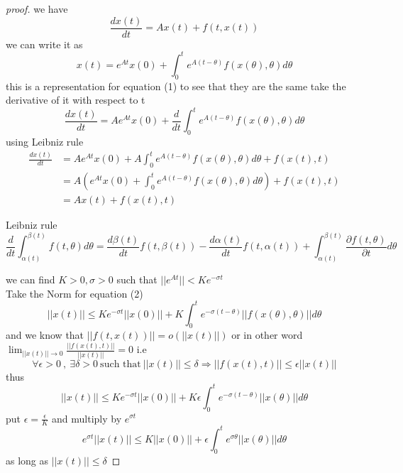 \documentclass[]{article}
\begin{document}
\begin{proof}[proof]
we have 
\begin{equation}
    \frac{dx(t)}{dt} = Ax(t) + f(t,x(t))
\end{equation}
we can write it as 
\begin{equation}
    x(t) = e^{At}x(0) + \int_{0}^{t} e^{A(t-\theta)} f(x(\theta),\theta) d \theta
\end{equation}
this is a representation for equation (1) to see that they are the same take the derivative of it with respect to t
\[
\frac{dx(t)}{dt} = A e^{At}x(0) + \frac{d}{dt} \int_{0}^{t} e^{A(t-\theta)} f(x(\theta),\theta) d \theta
\]
using Leibniz rule
\begin{align*}
    \frac{dx(t)}{dt} &= A e^{At}x(0) + A\int_{0}^{t} e^{A(t-\theta)} f(x(\theta),\theta) d \theta + f(x(t),t) 
    \\
    &=A\left(e^{At}x(0) + \int_{0}^{t} e^{A(t-\theta)} f(x(\theta),\theta) d \theta \right) + f(x(t),t)
    \\
    &= Ax(t) + f(x(t),t)
\end{align*}
\begin{enrichment*}{Leibniz rule}
    \[
        \frac{d}{dt}\int_{\alpha(t)}^{\beta(t)} f(t,\theta)d\theta = \frac{d\beta(t)}{dt}f(t,\beta(t))-\frac{d\alpha(t)}{dt}f(t,\alpha(t)) + \int_{\alpha(t)}^{\beta(t)} \frac{\partial f(t,\theta)}{\partial t} d\theta    
    \]
\end{enrichment*}
we can find $K>0,\sigma>0$ such that $||e^{At}||<Ke^{-\sigma t}$
\\
Take the Norm for equation (2)
\[
||x(t)|| \leq Ke^{-\sigma t}||x(0)|| + K\int_{0}^{t} e^{-\sigma(t-\theta)} ||f(x(\theta),\theta)|| d \theta
\]
and we know that $||f(t,x(t))|| = o(||x(t)||)$ or in other word 
$\displaystyle \lim_{||x(t)|| \to 0}\frac{||f(x(t),t)||}{||x(t)||} = 0$ i.e
\[
\forall \epsilon >0 \  , \ \exists \delta >0 \ \text{such that} \ || x(t)|| \leq \delta \Longrightarrow 
||f(x(t),t)|| \leq \epsilon ||x(t)||
\]
thus 
\[
||x(t)|| \leq Ke^{-\sigma t}||x(0)|| + K \epsilon \int_{0}^{t} e^{-\sigma(t-\theta)} ||x(\theta)|| d \theta
\]
put $\displaystyle \epsilon = \frac{\epsilon}{K}$ and multiply by  $e^{\sigma t}$
\[
e^{\sigma t}||x(t)|| \leq K||x(0)|| + \epsilon \int_{0}^{t} e^{\sigma \theta} ||x(\theta)|| d \theta
\]
as long as $||x(t)|| \leq \delta$


\end{proof}
\end{document}
